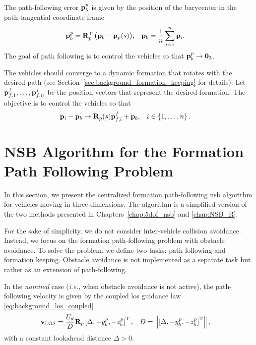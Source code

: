 The path-following error $\mathbf{p}_b^p$ is given by the position of the barycenter in the path-tangential coordinate frame 
\begin{align}
    \mathbf{p}_b^p &= \mathbf{R}_p^{\mathrm{T}} \, \big(\mathbf{p}_b - \mathbf{p}_p(s)\big), &
    \mathbf{p}_b &= \frac{1}{n} \sum_{i=1}^n \mathbf{p}_i.
    \label{eq:distr_NSB_barycenter}
\end{align}
The goal of path following is to control the vehicles so that $\mathbf{p}_b^p \rightarrow \mathbf{0}_3$.

The vehicles should converge to a dynamic formation that rotates with the desired path (see Section~\ref{sec:background_formation_keeping} for details).
Let $\mathbf{p}_{f,1}^f, \ldots, \mathbf{p}_{f,n}^f$ be the position vectors that represent the desired formation.
The objective is to control the vehicles so that
\begin{align}
    \mathbf{p}_i - \mathbf{p}_b &\rightarrow \mathbf{R}_p(s) \mathbf{p}_{f,i}^f + \mathbf{p}_b, &
    i &\in \left\{1, \ldots, n \right\}.
\end{align}

\section{NSB Algorithm for the Formation Path Following Problem}
\label{sec:distr_NSB_NSB}
In this section, we present the centralized formation path-following \gls{nsb} algorithm for vehicles moving in three dimensions.
The algorithm is a simplified version of the two methods presented in Chapters~\ref{chap:5dof_nsb} and \ref{chap:NSB_R}.

For the sake of simplicity, we do not consider inter-vehicle collision avoidance.
Instead, we focus on the formation path-following problem with obstacle avoidance.
To solve the problem, we define two tasks: path following and formation keeping.
Obstacle avoidance is not implemented as a separate task but rather as an extension of path-following.

In the \emph{nominal} case (\emph{i.e.,} when obstacle avoidance is not active), the path-following velocity is given by the coupled \acrfull{los} guidance law \eqref{eq:background_los_coupled}
\begin{align}
    \mathbf{v}_{\rm LOS} &= \frac{U_d}{D} \mathbf{R}_p \left[\Delta, -y_b^p, -z_b^p\right]^{\mathrm{T}}, &
    D &= \left\|\left[\Delta, -y_b^p, -z_b^p\right]^{\mathrm{T}}\right\|,
    \label{eq:distr_NSB_v_LOS_centralized}
\end{align}
with a constant lookahead distance $\Delta > 0$.

